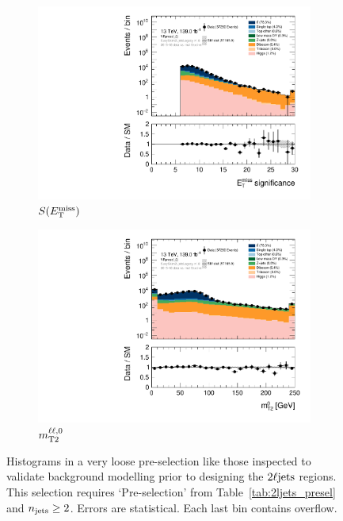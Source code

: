 \begin{figure}[tp]
\centering
\begin{subfigure}{0.48\textwidth}
\centering
\includegraphics[width=\textwidth]{figures/2ljets_prepre_met_Sign_VRpresel_2j_MCfakeslogY.pdf}
\caption{$S(E_\mathrm{T}^\mathrm{miss})$}
\end{subfigure}
\hfill
\begin{subfigure}{0.48\textwidth}
\centering
\includegraphics[width=\textwidth]{figures/2ljets_prepre_mt2leplsp_0_VRpresel_2j_MCfakeslogY.pdf}
\caption{$m_\mathrm{T2}^{\ell\ell,0}$}
\end{subfigure}
\caption[
Histograms in a very loose pre-selection
]{%
Histograms in a very loose pre-selection like those inspected to validate
background modelling prior to designing the $2\ell\mathrm{jets}$ regions.
This selection requires `Pre-selection' from Table~\ref{tab:2ljets_presel} and
$n_\mathrm{jets} \geq 2$.
Errors are statistical.
Each last bin contains overflow.
}
\label{fig:2ljets_prepre}
\end{figure}

